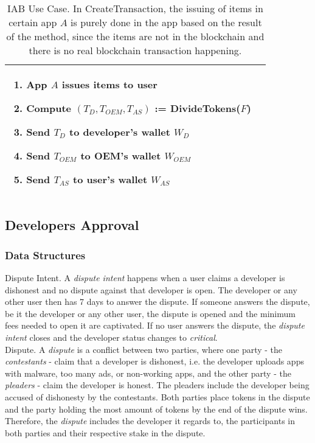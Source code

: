 \begin{table}[H]
\begin{tabular}{|p{}p{}|}
\begin{enumerate}
\begin{enumerate}
		\item App $A$ issues items to user
		\item Compute $(T_D, T_{OEM}, T_{AS})$ := \textsf{DivideTokens}($F$)
		\item Send $T_D$ to developer's wallet $W_D$
		\item Send $T_{OEM}$ to OEM's wallet $W_{OEM}$
		\item Send $T_{AS}$ to user's wallet $W_{AS}$
	\end{enumerate}
\end{enumerate} \\
\hline
\end{tabular}
\caption{IAB Use Case. In \textsf{CreateTransaction}, the issuing of items in certain app $A$ is purely done in the app based on the result of the method, since the items are not in the blockchain and there is no real blockchain transaction happening.}
\label{table: iab_protocol}
\end{table}

\subsection{Developers Approval}

\subsubsection{Data Structures}

\noindent \textsf{Dispute Intent}. A \textit{dispute intent} happens when a user claims a developer is dishonest and no dispute against that developer is open. The developer or any other user then has 7 days to answer the dispute. If someone answers the dispute, be it the developer or any other user, the dispute is opened and the minimum fees needed to open it are captivated. If no user answers the dispute, the \textit{dispute intent} closes and the developer status changes to \textit{critical}. \\

\noindent \textsf{Dispute}. A \textit{dispute} is a conflict between two parties, where one party - the \textit{contestants} - claim that a developer is dishonest, i.e. the developer uploads apps with malware, too many ads, or non-working apps, and the other party - the \textit{pleaders} - claim the developer is honest. The pleaders include the developer being accused of dishonesty by the contestants. Both parties place tokens in the dispute and the party holding the most amount of tokens by the end of the dispute wins. Therefore, the \textit{dispute} includes the developer it regards to, the participants in both parties and their respective stake in the dispute. \\

